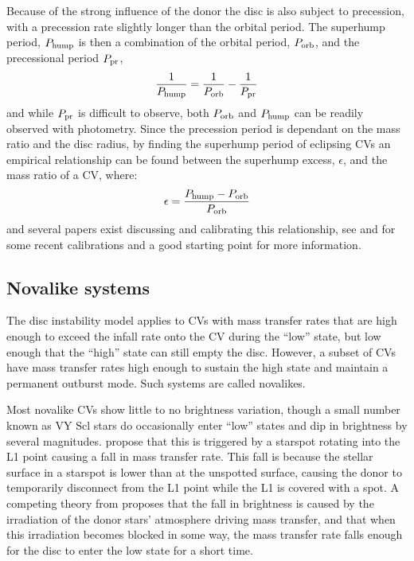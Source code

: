 Because of the strong influence of the donor the disc is also subject to precession, with a precession rate slightly longer than the orbital period. The superhump period, $P_{\rm hump}$ is then a combination of the orbital period, $P_{\rm orb}$, and the precessional period $P_{\rm pr}$,
\begin{equation}
    \frac{1}{P_{\rm hump}} = \frac{1}{P_{\rm orb}} - \frac{1}{P_{\rm pr}}
\end{equation}
and while $P_{\rm pr}$ is difficult to observe, both $P_{\rm orb}$ and $P_{\rm hump}$ can be readily observed with photometry. Since the precession period is dependant on the mass ratio and the disc radius, by finding the superhump period of eclipsing CVs an empirical relationship can be found between the superhump excess, $\epsilon$, and the mass ratio of a CV, where:
\begin{equation}
    \epsilon = \frac{P_{\rm hump} - P_{\rm orb}}{P_{\rm orb}}
\end{equation}
and several papers exist discussing and calibrating this relationship, see \citet{McAllister2019} and \citet{kato2022} for some recent calibrations and a good starting point for more information.


\subsection{Novalike systems}

The disc instability model applies to CVs with mass transfer rates that are high enough to exceed the infall rate onto the CV during the ``low'' state, but low enough that the ``high'' state can still empty the disc. However, a subset of CVs have mass transfer rates high enough to sustain the high state and maintain a permanent outburst mode. Such systems are called novalikes. 

Most novalike CVs show little to no brightness variation, though a small number known as VY Scl stars do occasionally enter ``low'' states and dip in brightness by several magnitudes. \citet{livio1994} propose that this is triggered by a starspot rotating into the L1 point causing a fall in mass transfer rate. This fall is because the stellar surface in a starspot is lower than at the unspotted surface, causing the donor to temporarily disconnect from the L1 point while the L1 is covered with a spot.
A competing theory from \citet{wu1995} proposes that the fall in brightness is caused by the irradiation of the donor stars' atmosphere driving mass transfer, and that when this irradiation becomes blocked in some way, the mass transfer rate falls enough for the disc to enter the low state for a short time.


